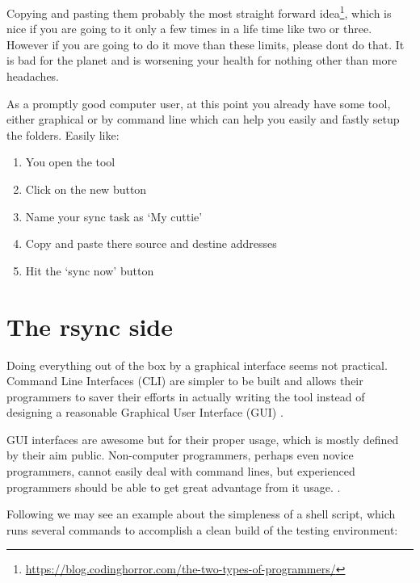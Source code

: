     Copying and pasting them probably the most straight forward
    idea\footnote{\url{https://blog.codinghorror.com/the-two-types-of-programmers/}},
    which is
    nice if you are going to it only a few times in a life time like two or
    three. However if you are going to do it move than these limits,
    please don\q t do that. It is bad for the planet and is worsening your
    health for nothing other than more headaches.

    As a promptly good computer user, at this point you already have some tool,
    either graphical or by command line which can help you easily and fastly
    setup the folder\q s. Easily like:

    \begin{enumerate}
        \item You open the tool
        \item Click on the new button
        \item Name your sync task as `My cuttie'
        \item Copy and paste there source and destine addresses
        \item Hit the `sync now' button
    \end{enumerate}



    \section{The rsync side}

    Doing everything out of the box by a graphical interface seems not
    practical. Command Line Interfaces (CLI) are simpler to be built and allows
    their programmers to saver their efforts in actually writing the tool
    instead of designing a reasonable Graphical User Interface (GUI)
    \cite{quantificationOfInterface}.

    GUI interfaces are awesome but for their proper usage, which is mostly
    defined by their aim public. Non-computer programmers, perhaps even novice
    programmers, cannot easily deal with command lines, but experienced
    programmers should be able to get great advantage from it usage.
    \cite{commandLineInterface}.

    Following we may see an example about the simpleness of a shell script,
    which runs several commands to accomplish a clean build of the testing
    environment:

